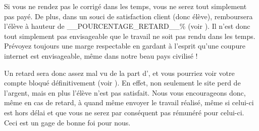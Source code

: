 ﻿Si vous ne rendez pas le corrigé dans les temps, vous ne serez tout simplement pas payé. De plus, dans un souci de satisfaction client (donc élève), \eDevoir remboursera l'élève à hauteur de __POURCENTAGE_RETARD__\% (voir ). Il n'est donc tout simplement pas envisageable que le travail ne soit pas rendu dans les temps. Prévoyez toujours une marge respectable en gardant à l'esprit qu'une coupure internet est envisageable, même dans notre beau pays civilisé !

Un retard sera donc assez mal vu de la part d'\eDevoir, et vous pourriez voir votre compte bloqué définitivement (voir ). En effet, non seulement le site perd de l'argent, mais en plus l'élève n'est pas satisfait. Nous vous encourageons donc, même en cas de retard, à quand même envoyer le travail réalisé, même si celui-ci est hors délai et que vous ne serez par conséquent pas rémunéré pour celui-ci. Ceci est un gage de bonne foi pour nous.